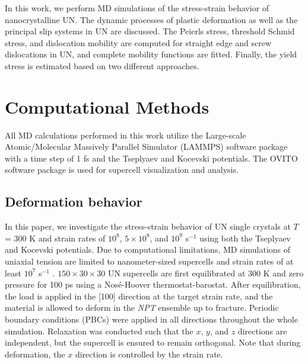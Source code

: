 \documentclass[applsci,article,submit,pdftex,moreauthors]{Definitions/mdpi}
\newcommand{\?}{\stackrel{?}{=}}
\begin{document}
In this work, we perform MD simulations of the stress-strain behavior of nanocrystalline UN. The dynamic processes of plastic deformation as well as the principal slip systems in UN are discussed. The Peierls stress, threshold Schmid stress, and dislocation mobility are computed for straight edge and screw dislocations in UN, and complete mobility functions are fitted. Finally, the yield stress is estimated based on two different approaches.

\section{Computational Methods}

All MD calculations performed in this work utilize the Large-scale Atomic/Molecular Massively Parallel Simulator (LAMMPS) software package \cite{Thompson2022} with a time step of 1 fs and the Tseplyaev \cite{Tseplyaev2016} and Kocevski \cite{Kocevski2022II} potentials. The OVITO software package \cite{Stukowski2010} is used for supercell visualization and analysis.

\subsection{Deformation behavior}

In this paper, we investigate the stress-strain behavior of UN single crystals at $T$ = 300 K and strain rates of $10^8$, $5 \times 10^8$, and $10^9$ s$^{-1}$ using both the Tseplyaev and Kocevski potentials. Due to computational limitations, MD simulations of uniaxial tension are limited to nanometer-sized supercells and strain rates of at least $10^7$ s$^{-1}$ \cite{Lao2013}. $150 \times 30 \times 30$ UN supercells are first equilibrated at 300 K and zero pressure for 100 ps using a Nosé-Hoover thermostat-barostat. After equilibration, the load is applied in the [100] direction at the target strain rate, and the material is allowed to deform in the \textit{NPT} ensemble up to fracture. Periodic boundary conditions (PBCs) were applied in all directions throughout the whole simulation. Relaxation was conducted such that the $x$, $y$, and $z$ directions are independent, but the supercell is ensured to remain orthogonal. Note that during deformation, the $x$ direction is controlled by the strain rate.
\end{document}
